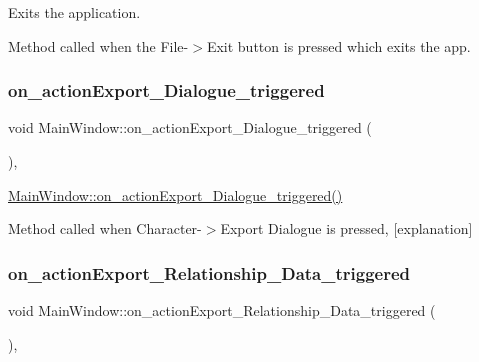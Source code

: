 Exits the application. 

Method called when the File-\/$>$Exit button is pressed which exits the app. \mbox{\label{class_main_window_a60afb0fb3babf373c67896540945f466}} 
\subsubsection{\texorpdfstring{on\+\_\+action\+Export\+\_\+\+Dialogue\+\_\+triggered}{on\_actionExport\_Dialogue\_triggered}}
{\footnotesize\ttfamily void Main\+Window\+::on\+\_\+action\+Export\+\_\+\+Dialogue\+\_\+triggered (\begin{DoxyParamCaption}{ }\end{DoxyParamCaption})\hspace{0.3cm}{\ttfamily [private]}, {\ttfamily [slot]}}



\hyperlink{class_main_window_a60afb0fb3babf373c67896540945f466}{Main\+Window\+::on\+\_\+action\+Export\+\_\+\+Dialogue\+\_\+triggered()} 

Method called when Character-\/$>$Export Dialogue is pressed, \mbox{[}explanation\mbox{]} \mbox{\label{class_main_window_a3f75e84ed258d8b94b97c8043070f901}} 
\subsubsection{\texorpdfstring{on\+\_\+action\+Export\+\_\+\+Relationship\+\_\+\+Data\+\_\+triggered}{on\_actionExport\_Relationship\_Data\_triggered}}
{\footnotesize\ttfamily void Main\+Window\+::on\+\_\+action\+Export\+\_\+\+Relationship\+\_\+\+Data\+\_\+triggered (\begin{DoxyParamCaption}{ }\end{DoxyParamCaption})\hspace{0.3cm}{\ttfamily [private]}, {\ttfamily [slot]}}




